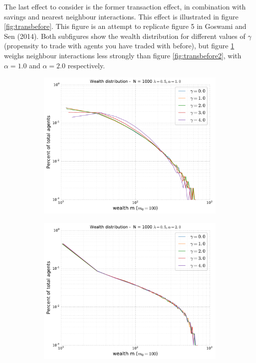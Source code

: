 \documentclass[10pt, a4paper]{amsart}
\begin{document}

The last effect to consider is the former transaction effect, in combination with savings and nearest neighbour interactions. This effect is illustrated in figure \ref{fig:transbefore}. This figure is an attempt to replicate figure 5 in Goswami and Sen (2014)\cite{GoswamiSen}. Both subfigures show the wealth distribution for different values of $\gamma$ (propensity to trade with agents you have traded with before), but figure \ref{fig:transbefore1} weighs neighbour interactions less strongly than figure \ref{fig:transbefore2}, with $\alpha=1.0$ and $\alpha=2.0$ respectively. 

\begin{figure}
\begin{subfigure}{.49\textwidth}
	\centering
	\includegraphics[width=\linewidth]{../figures/5e/5e_05-10-var.pdf}
	\caption{}
	\label{fig:transbefore1}
\end{subfigure}
\begin{subfigure}{.49\textwidth}
	\centering
	\includegraphics[width=\linewidth]{../figures/5e/5e_05-20-var.pdf}

\end{subfigure}
\end{figure}
\end{document}
